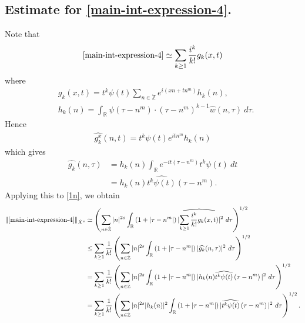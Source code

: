 \documentclass[12pt,reqno]{amsart}
\numberwithin{equation}{section}  %
\numberwithin{figure}{section}
\newcommand{\rr}{\mathbb{R}}
\newcommand{\zz}{\mathbb{Z}}
\newcommand{\zzdot}{\dot{\zz}}
\newcommand{\wh}{\widehat}
\theoremstyle{plain}
\theoremstyle{definition}
\theoremstyle{remark}
\begin{document}
\subsection{Estimate for \eqref{main-int-expression-4}.}
Note that
%
%
\begin{equation}
	\label{1n}
	\begin{split}
		\eqref{main-int-expression-4} \simeq \sum_{k \ge 1}
		\frac{i^k}{k!}g_k(x,t)
	\end{split}
\end{equation}
%
%
where 
%
%
\begin{equation*}
	\begin{split}
		& g_k(x,t) = t^k \psi(t) \sum_{n \in \zzdot} e^{i\left( xn + tn^{m}
		\right)} h_k(n),
		\\
		& h_k(n) = \int_\rr \psi \left( \tau - n^{m } \right) \cdot \left(
		\tau - n^{m } \right)^{k -1} \wh{w}(n, \tau) \ d \tau.
	\end{split}
\end{equation*}
%
%
Hence
%
%
\begin{equation*}
	\begin{split}
		\wh{g_k^x}(n, t) = t^{k} \psi(t) e^{i t n^{m }} h_k(n)
	\end{split}
\end{equation*}
%
%
which gives
%
%
\begin{equation*}
	\begin{split}
		\wh{g_k}(n, \tau)
		& = h_k(n) \int_\rr e^{-it\left( \tau - n^{m } \right)}
		t^{k}\psi(t) \ dt
		\\
		& = h_k(n) \wh{t^{k}\psi(t)} \left( \tau - n^{m } \right).
	\end{split}
\end{equation*}
%
%
Applying this to \eqref{1n}, we obtain
%
%
\begin{equation}
	\label{2n}
	\begin{split}
		\|\eqref{main-int-expression-4}\|_{\dot{X}^s} 
		& \simeq \left( \sum_{n \in \zzdot} |n|^{2s} \int_\rr \left( 1 + | \tau -
		n^{m }
		|
		\right) | \wh{\sum_{k \ge 1} \frac{i^k}{k!}g_k(x,t)} |^2 \ d \tau
		\right)^{1/2}
		\\
		& \le \sum_{k \ge 1} \frac{1}{k!}\left( \sum_{n \in \zzdot} |n|^{2s}
		\int_\rr \left( 1 + | \tau - n^{m } | \right) | \wh{g_k}(n, \tau) |^2 \
		d \tau \right)^{1/2}
		\\
		& = \sum_{k \ge 1} \frac{1}{k!} \left( \sum_{n \in \zzdot} |n|^{2s}
		\int_\rr \left( 1 + | \tau - n^{m } | \right) | h_k(n) \wh{t^k
		\psi(t)} \left( \tau - n^{m } \right) |^2 \ d \tau \right)^{1/2}
		\\
		& = \sum_{k \ge 1} \frac{1}{k!} \left( \sum_{n \in \zzdot} |n|^{2s} |
		h_k(n) |^2 \int_\rr \left( 1 + | \tau - n^{m } | \right) | \wh{t^k
		\psi(t)} \left( \tau - n^{m } \right) |^2 \ d \tau \right)^{1/2}.
	\end{split}
\end{equation}
\end{document}
